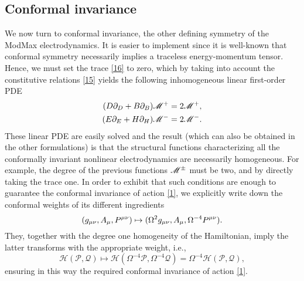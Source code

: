 \subsection{Conformal invariance}
We now turn to conformal invariance, the other defining symmetry of the ModMax electrodynamics. It is easier to implement since it is well-known that conformal symmetry necessarily implies a traceless energy-momentum tensor. Hence, we must set the trace \eqref{16} to zero, which by taking into account the constitutive relations \eqref{15} yields the following inhomogeneous linear first-order PDE
\begin{subequations}\label{27}
	\begin{align}
  (D\partial_D+B\partial_B)\mathscr{M}^+&=2\mathscr{M}^+,\\
  (E\partial_E+H\partial_H)\mathscr{M}^-&=2\mathscr{M}^-.
\end{align}
\end{subequations}
These linear PDE are easily solved and the result (which can also be obtained in the other formulations) is that the structural functions characterizing all the conformally invariant nonlinear electrodynamics are necessarily homogeneous. For example, the degree of the previous functions $\mathscr{M}^{\pm }$ must be two, and by directly taking the trace one. In order to exhibit that such conditions are enough to guarantee the conformal invariance of action \eqref{1}, we explicitly write down the conformal weights of its different ingredients
\begin{equation}\label{28}
  (g_{\mu\nu },A_\mu ,P^{\mu\nu }) \mapsto (\Omega^2 g_{\mu\nu },A_\mu ,\Omega^{-4}P^{\mu\nu }).
\end{equation}
They, together with the degree one homogeneity of the Hamiltonian, imply the latter transforms with the appropriate weight, i.e.,
\begin{equation}\label{29}
  \mathscr{H}(\mathscr{P},\mathscr{Q})\mapsto \mathscr{H}(\Omega^{-4}\mathscr{P},\Omega^{-4}\mathscr{Q})=\Omega^{-4}\mathscr{H}(\mathscr{P},\mathscr{Q}),
\end{equation}
ensuring in this way the required conformal invariance of action \eqref{1}.

